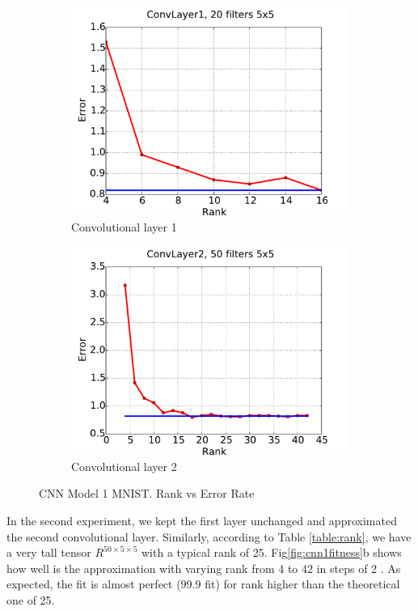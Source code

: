 \begin{figure}[h!]
  \centering
  \begin{subfigure}[b]{0.40\textwidth}
   \includegraphics[width=\textwidth]{images/model1_convL1_error.pdf}
    \caption{Convolutional layer 1}
  \end{subfigure}
  \begin{subfigure}[b]{0.40\textwidth}
    \includegraphics[width=\textwidth]{images/model1_convL2_error.pdf}
    \caption{Convolutional layer 2}
  \end{subfigure}
  \caption{CNN Model 1 MNIST. Rank vs Error Rate}
  \label{fig:cnn1error}
\end{figure}

In the second experiment, we kept the first layer unchanged and approximated the second convolutional layer.
Similarly, according to Table \ref{table:rank}, we have a very tall tensor $R^{50\times 5 \times 5}$ with a typical rank of 25.
Fig\ref{fig:cnn1fitness}b shows how well is the approximation with varying rank from 4 to 42 in steps of 2 . As expected, the fit is almost perfect (99.9 fit) for rank higher than the theoretical one of 25.

